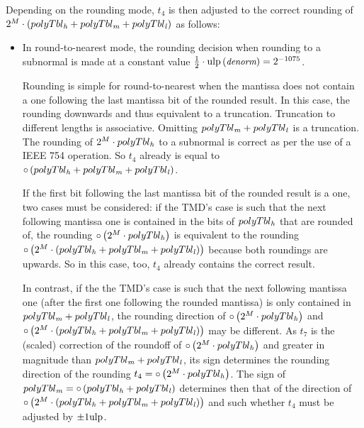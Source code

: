 Depending on the rounding mode, $t_4$ is then adjusted to the correct
rounding of \\$2^M \cdot \left( polyTbl_{\mathit{h}} + polyTbl_{\mathit{m}} + polyTbl_{\mathit{l}}
\right)$ as follows:
\begin{itemize}
\item In round-to-nearest mode, the rounding decision when rounding to
a subnormal is made at a constant value $\frac{1}{2} \cdot \mathrm{ulp}\left(
\mbox{\small \it denorm}\right) = 2^{-1075}$. 

Rounding is simple for round-to-nearest when the mantissa does not
contain a one following the last mantissa bit of the rounded
result. In this case, the rounding downwards and thus equivalent to a
truncation. Truncation to different lengths is associative. Omitting
$polyTbl_{\mathit{m}} + polyTbl_{\mathit{l}}$ is a truncation. The rounding of $2^M
\cdot polyTbl_{\mathit{h}}$ to a subnormal is correct as per the use of a IEEE
754 operation. So $t_4$ already is equal to $\circ\left( polyTbl_{\mathit{h}}
+ polyTbl_{\mathit{m}} + polyTbl_{\mathit{l}} \right)$.

If the first bit following the last mantissa bit of the rounded result
is a one, two cases must be considered: if the TMD's case is such that
the next following mantissa one is contained in the bits of
$polyTbl_{\mathit{h}}$ that are rounded of, the rounding $\circ \left( 2^M
\cdot polyTbl_{\mathit{h}} \right)$ is equivalent to the rounding $\circ
\left( 2^M \cdot \left( polyTbl_{\mathit{h}} + polyTbl_{\mathit{m}} + polyTbl_{\mathit{l}}
\right) \right)$ because both roundings are upwards. So in this case,
too, $t_4$ already contains the correct result. 

In contrast, if the the TMD's case is such that the next following
mantissa one (after the first one following the rounded mantissa) is
only contained in $polyTbl_{\mathit{m}} + polyTbl_{\mathit{l}}$, the rounding direction
of $\circ \left( 2^M \cdot polyTbl_{\mathit{h}} \right)$ and $\circ \left(
2^M \cdot \left( polyTbl_{\mathit{h}} + polyTbl_{\mathit{m}} + polyTbl_{\mathit{l}} \right)
\right)$ may be different.  As $t_7$ is the (scaled) correction of the
roundoff of $\circ \left( 2^M \cdot polyTbl_{\mathit{h}} \right)$ and greater
in magnitude than $polyTbl_{\mathit{m}} + polyTbl_{\mathit{l}}$, its sign determines the
rounding direction of the rounding $t_4 = \circ \left( 2^M \cdot
polyTbl_{\mathit{h}} \right)$. The sign of $polyTbl_{\mathit{m}} = \circ \left(
polyTbl_{\mathit{h}} + polyTbl_{\mathit{l}} \right)$ determines then that of the
direction of \\$\circ \left( 2^M \cdot \left( polyTbl_{\mathit{h}} + polyTbl_{\mathit{m}}
+ polyTbl_{\mathit{l}} \right) \right)$ and such whether $t_4$ must be adjusted
by $\pm 1 \mathrm{ulp}$.


\end{itemize}
